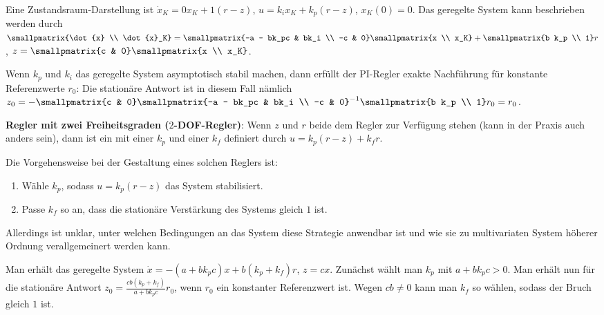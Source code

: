 Eine Zustandsraum-Darstellung ist $\dot{x}_K = 0x_K + 1(r - z)$,
$u = k_i x_K + k_p(r - z)$, $x_K(0) = 0$.
Das geregelte System kann beschrieben werden durch
$\smallpmatrix{\dot{x} \\ \dot{x}_K} = \smallpmatrix{-a - bk_pc & bk_i \\ -c & 0}
\smallpmatrix{x \\ x_K} + \smallpmatrix{b k_p \\ 1} r$,
$z = \smallpmatrix{c & 0} \smallpmatrix{x \\ x_K}$.

Wenn $k_p$ und $k_i$ das geregelte System asymptotisch stabil machen, dann erfüllt der
PI-Regler exakte Nachführung für konstante Referenzwerte $r_0$:
Die stationäre Antwort ist in diesem Fall nämlich
$z_0 = -\smallpmatrix{c & 0} \smallpmatrix{-a - bk_pc & bk_i \\ -c & 0}^{-1}
\smallpmatrix{b k_p \\ 1} r_0 = r_0$.

\linie

\textbf{Regler mit zwei Freiheitsgraden ($2$-DOF-Regler)}:
Wenn $z$ und $r$ beide dem Regler zur Verfügung stehen (kann in der Praxis auch anders sein),
dann ist ein  mit einer
 $k_p$ und einer
 $k_f$ definiert durch
$u = k_p (r - z) + k_f r$.

Die Vorgehensweise bei der Gestaltung eines solchen Reglers ist:
\begin{enumerate}
    \item
    Wähle $k_p$, sodass $u = k_p (r - z)$ das System stabilisiert.

    \item
    Passe $k_f$ so an, dass die stationäre Verstärkung des Systems gleich $1$ ist.
\end{enumerate}
Allerdings ist unklar, unter welchen Bedingungen an das System diese Strategie anwendbar ist und
wie sie zu multivariaten System höherer Ordnung verallgemeinert werden kann.

Man erhält das geregelte System $\dot{x} = -(a + bk_p c)x + b (k_p + k_f) r$, $z = cx$.
Zunächst wählt man $k_p$ mit $a + bk_p c > 0$.
Man erhält nun für die stationäre Antwort $z_0 = \frac{cb (k_p + k_f)}{a + bk_p c} r_0$,
wenn $r_0$ ein konstanter Referenzwert ist.
Wegen $cb \not= 0$ kann man $k_f$ so wählen, sodass der Bruch gleich $1$ ist.

